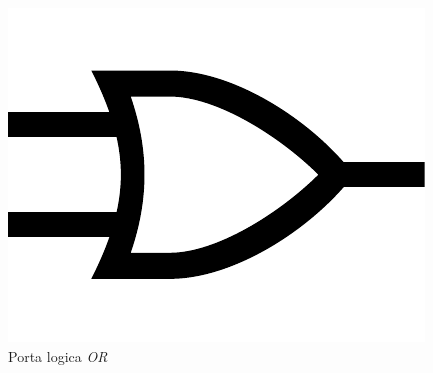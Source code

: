 \begin{frame}
\begin{columns}
		\begin{figure}[!htbp] 
			\centering 
			\includegraphics[width=0.5\linewidth]{images/2_elettronica/logic_gate_or.pdf}
			\caption{Porta logica \textit{OR}}
		\end{figure}
		
	\end{columns}
	
\end{frame}


